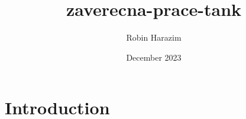 \documentclass{article}
\title{zaverecna-prace-tank}
\author{Robin Harazim}
\date{December 2023}
\begin{document}
\maketitle

\section{Introduction}
\end{document}

